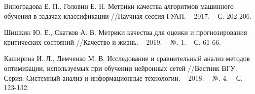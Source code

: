 \documentclass{article}
\begin{document}
\begin{thebibliography}{}
		 Виноградова Е. П., Головин Е. Н. Метрики качества алгоритмов машинного обучения в задачах классификации //Научная сессия ГУАП. – 2017. – С. 202-206.
		
		 Шишкин Ю. Е., Скатков А. В. Метрики качества для оценки и прогнозирования критических состояний //Качество и жизнь. – 2019. – №. 1. – С. 61-66.
		
		 Каширина И. Л., Демченко М. В. Исследование и сравнительный анализ методов оптимизации, используемых при обучении нейронных сетей //Вестник ВГУ. Серия: Системный анализ и информационные технологии. – 2018. – №. 4. – С. 123-132.
	\end{thebibliography}
	
\end{document}
